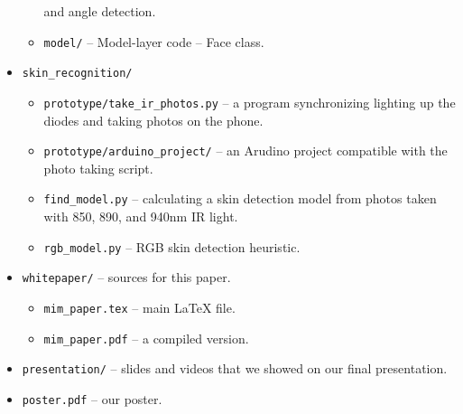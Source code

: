 \begin{itemize}
\begin{itemize}
                  and angle detection.
            \item \texttt{model/} -- Model-layer code -- Face class.
        \end{itemize}
        \item \texttt{skin\_recognition/}
        \begin{itemize}
            \item \texttt{prototype/take\_ir\_photos.py} -- a program synchronizing
                  lighting up the diodes and taking photos on the phone.
            \item \texttt{prototype/arduino\_project/} -- an Arudino project
                  compatible with the photo taking script.
            \item \texttt{find\_model.py} -- calculating a skin detection model from
                  photos taken with 850, 890, and 940nm IR light.
            \item \texttt{rgb\_model.py} -- RGB skin detection heuristic.
        \end{itemize}
        \item \texttt{whitepaper/} -- sources for this paper.
        \begin{itemize}
            \item \texttt{mim\_paper.tex} -- main LaTeX file.
            \item \texttt{mim\_paper.pdf} -- a compiled version.
        \end{itemize}
        \item \texttt{presentation/} -- slides and videos that we showed on our
              final presentation.
        \item \texttt{poster.pdf} -- our poster.
    \end{itemize}
